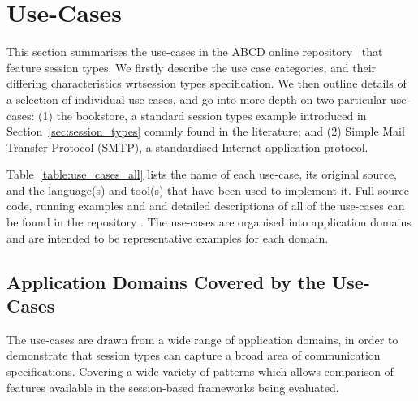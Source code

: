 
\section{Use-Cases}
\label{sec:usecases}

This section summarises the use-cases in the ABCD online repository~\cite{usecase_repository} that feature session types.  We firstly describe the use case categories, and their differing characteristics wrt\. session types specification.  We then outline details of a selection of individual use cases, and go into more depth on two particular use-cases: (1) the bookstore, a standard session types example introduced in Section~\ref{sec:session_types} commly found in the literature; and (2) Simple Mail Transfer Protocol (SMTP), a standardised Internet application protocol.

Table~\ref{table:use_cases_all} lists the name of each use-case, its original source, and the language(s) and tool(s) that have been used to implement it. Full source code, running examples and and detailed descriptiona of all of the use-cases can be found in the repository \cite{usecase_repository}.  The use-cases are organised into application domains and are intended to be representative examples for each domain.




\subsection{Application Domains Covered by the Use-Cases}

The use-cases are drawn from a wide range of
application domains, in order to demonstrate that
session types can capture
a broad area of communication specifications.
Covering a wide variety of patterns which allows comparison of features available in the session-based frameworks being evaluated.




